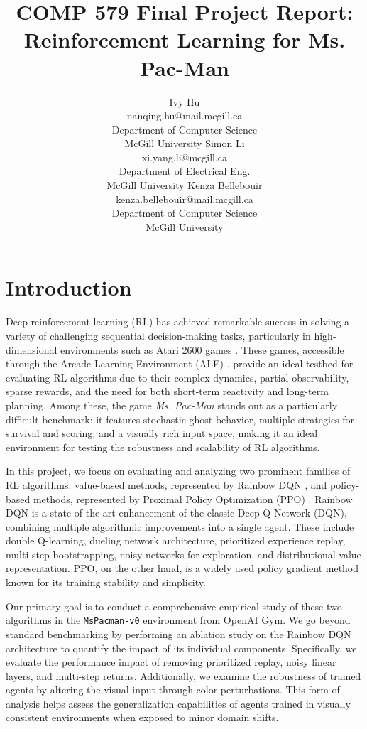 \documentclass{article}
\title{COMP 579 Final Project Report: Reinforcement Learning for Ms. Pac-Man}
\author{
  Ivy Hu \\
  nanqing.hu@mail.mcgill.ca \\
  Department of Computer Science\\
  McGill University
  \And
  Simon Li \\
  xi.yang.li@mcgill.ca\\
  Department of Electrical Eng.\\
  McGill University
  \And
  Kenza Bellebouir\\
  kenza.bellebouir@mail.mcgill.ca\\
  Department of Computer Science\\
  McGill University
}
\begin{document}
\maketitle

\section{Introduction}

Deep reinforcement learning (RL) has achieved remarkable success in solving a variety of challenging sequential decision-making tasks, particularly in high-dimensional environments such as Atari 2600 games \cite{mnih2015human}. These games, accessible through the Arcade Learning Environment (ALE) \cite{ale}, provide an ideal testbed for evaluating RL algorithms due to their complex dynamics, partial observability, sparse rewards, and the need for both short-term reactivity and long-term planning. Among these, the game \textit{Ms. Pac-Man} stands out as a particularly difficult benchmark: it features stochastic ghost behavior, multiple strategies for survival and scoring, and a visually rich input space, making it an ideal environment for testing the robustness and scalability of RL algorithms.

In this project, we focus on evaluating and analyzing two prominent families of RL algorithms: value-based methods, represented by Rainbow DQN \cite{hessel2018rainbow}, and policy-based methods, represented by Proximal Policy Optimization (PPO) \cite{schulman2017proximal}. Rainbow DQN is a state-of-the-art enhancement of the classic Deep Q-Network (DQN), combining multiple algorithmic improvements into a single agent. These include double Q-learning, dueling network architecture, prioritized experience replay, multi-step bootstrapping, noisy networks for exploration, and distributional value representation. PPO, on the other hand, is a widely used policy gradient method known for its training stability and simplicity.

Our primary goal is to conduct a comprehensive empirical study of these two algorithms in the \texttt{MsPacman-v0} environment from OpenAI Gym. We go beyond standard benchmarking by performing an ablation study on the Rainbow DQN architecture to quantify the impact of its individual components. Specifically, we evaluate the performance impact of removing prioritized replay, noisy linear layers, and multi-step returns. Additionally, we examine the robustness of trained agents by altering the visual input through color perturbations. This form of analysis helps assess the generalization capabilities of agents trained in visually consistent environments when exposed to minor domain shifts.
\end{document}
